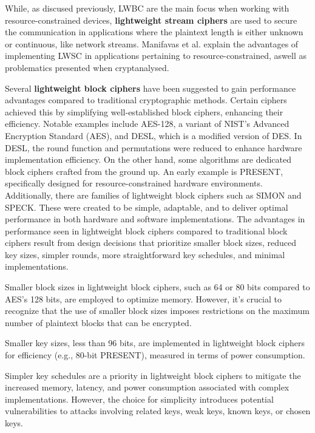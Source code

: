 \documentclass[conference,compsoc]{IEEEtran}
\begin{document}
While, as discused previously, LWBC are the main focus when working with resource-constrained devices, \textbf{lightweight stream ciphers} are used to secure the communication in applications where the plaintext length is either unknown or continuous, like network streams. Manifavas et al.\cite{manifavas2016survey} explain the advantages of implementing LWSC in applications pertaining to resource-constrained, aswell as problematics presented when cryptanalysed.

Several \textbf{lightweight block ciphers} have been suggested to gain performance advantages compared to traditional cryptographic methods. Certain ciphers achieved this by simplifying well-established block ciphers, enhancing their efficiency. Notable examples include AES-128\cite{AES-128}, a variant of NIST's Advanced Encryption Standard (AES), and DESL\cite{DESL}, which is a modified version of DES. In DESL, the round function and permutations were reduced to enhance hardware implementation efficiency.
On the other hand, some algorithms are dedicated block ciphers crafted from the ground up. An early example is PRESENT\cite{PRESENT}, specifically designed for resource-constrained hardware environments. Additionally, there are families of lightweight block ciphers such as SIMON and SPECK\cite{SIMONSPECK}. These were created to be simple, adaptable, and to deliver optimal performance in both hardware and software implementations.
The advantages in performance seen in lightweight block ciphers compared to traditional block ciphers result from design decisions that prioritize smaller block sizes, reduced key sizes, simpler rounds, more straightforward key schedules, and minimal implementations. 

Smaller block sizes in lightweight block ciphers, such as 64 or 80 bits compared to AES's 128 bits, are employed to optimize memory. However, it's crucial to recognize that the use of smaller block sizes imposes restrictions on the maximum number of plaintext blocks that can be encrypted. 

Smaller key sizes, less than 96 bits, are implemented in lightweight block ciphers for efficiency (e.g., 80-bit PRESENT), measured in terms of power consumption.

Simpler key schedules are a priority in lightweight block ciphers to mitigate the increased memory, latency, and power consumption associated with complex implementations. However, the choice for simplicity introduces potential vulnerabilities to attacks involving related keys, weak keys, known keys, or chosen keys.
\end{document}
